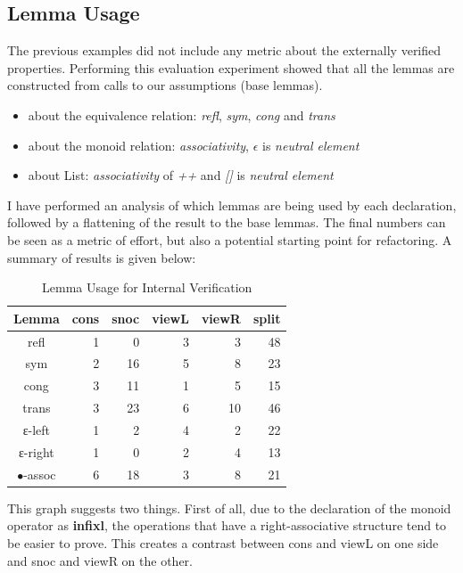 \documentclass[12pt,twoside,notitlepage]{report}
\begin{document}
\subsection{Lemma Usage}
\label{eval:lemma}
The previous examples did not include any metric about the externally verified properties. 
Performing this evaluation experiment showed that all the lemmas are constructed from calls to our assumptions (base lemmas).

\begin{itemize}
\item about the equivalence relation: \textit{refl}, \textit{sym}, \textit{cong} and \textit{trans}
\item about the monoid relation: \textit{associativity}, $\epsilon$ is \textit{neutral element}
\item about List: \textit{associativity} of \textit{++} and \textit{[]} is \textit{neutral element}
\end{itemize} 

I have performed an analysis of which lemmas are being used by each declaration, followed by a flattening of the result to the base lemmas. The final numbers can be seen as a metric of effort, but also a potential starting point for refactoring. A summary of results is given below:

\begin{table}[H]
\caption{Lemma Usage for Internal Verification}
\center
\begin{tabular}{c r r r r r}
\hline 
Lemma & cons & snoc & viewL & viewR & split \\
\hline
refl  	&	1	&	0	&	3&	3&  48\\
sym     &	2	&	16	&	5&	8&	23\\
cong   	&	3	&	11	&	1&	5&	15\\
trans  	&	3	&	23	&	6&	10& 46\\
ε-left  &	1	&	2	&	4&	2& 22\\  
ε-right &	1	&	0	&	2&	4& 13\\
$∙$-assoc &	6	&	18	&	3&	8& 21\\
\hline
\end{tabular}
\end{table} 

This graph suggests two things. First of all, due to the declaration of the monoid operator as \textbf{infixl}, the operations that have a right-associative structure tend to be easier to prove. This creates a contrast between cons and viewL on one side and snoc and viewR on the other. 
\end{document}
